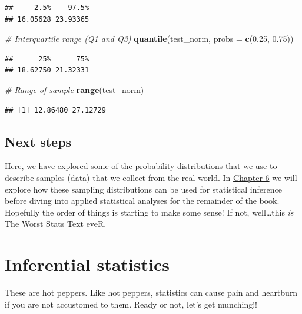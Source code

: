 \documentclass[
]{book}
\newenvironment{Shaded}{\begin{snugshade}}{\end{snugshade}}
\newcommand{\CommentTok}[1]{\textcolor[rgb]{0.56,0.35,0.01}{\textit{#1}}}
\newcommand{\DataTypeTok}[1]{\textcolor[rgb]{0.13,0.29,0.53}{#1}}
\newcommand{\FloatTok}[1]{\textcolor[rgb]{0.00,0.00,0.81}{#1}}
\newcommand{\KeywordTok}[1]{\textcolor[rgb]{0.13,0.29,0.53}{\textbf{#1}}}
\newcommand{\NormalTok}[1]{#1}
\begin{document}
\begin{verbatim}
##     2.5%    97.5% 
## 16.05628 23.93365
\end{verbatim}

\begin{Shaded}
\begin{Highlighting}[]
\CommentTok{# Interquartile range (Q1 and Q3)}
\KeywordTok{quantile}\NormalTok{(test_norm, }\DataTypeTok{probs =} \KeywordTok{c}\NormalTok{(}\FloatTok{0.25}\NormalTok{, }\FloatTok{0.75}\NormalTok{))    }
\end{Highlighting}
\end{Shaded}

\begin{verbatim}
##      25%      75% 
## 18.62750 21.32331
\end{verbatim}

\begin{Shaded}
\begin{Highlighting}[]
\CommentTok{# Range of sample}
\KeywordTok{range}\NormalTok{(test_norm)                             }
\end{Highlighting}
\end{Shaded}

\begin{verbatim}
## [1] 12.86480 27.12729
\end{verbatim}

\hypertarget{next5}{%
\section{Next steps}\label{next5}}

Here, we have explored some of the probability distributions that we use to describe samples (data) that we collect from the real world. In \protect\hyperlink{Chapter6}{Chapter 6} we will explore how these sampling distributions can be used for statistical inference before diving into applied statistical analyses for the remainder of the book. Hopefully the order of things is starting to make some sense! If not, well\ldots this \emph{is} The Worst Stats Text eveR.

\hypertarget{Chapter6}{%
\chapter{Inferential statistics}\label{Chapter6}}

These are hot peppers. Like hot peppers, statistics can cause pain and heartburn if you are not accustomed to them. Ready or not, let's get munching!!
\end{document}
